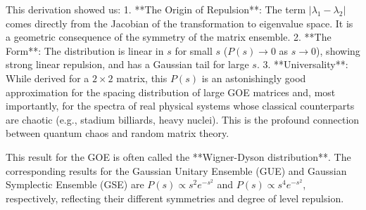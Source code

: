 \documentclass[10pt]{article}
\begin{document}
%
%
%


This derivation showed us:
1.  **The Origin of Repulsion**: The term $|\lambda_1 - \lambda_2|$ comes directly from the Jacobian of the transformation to eigenvalue space. It is a geometric consequence of the symmetry of the matrix ensemble.
2.  **The Form**: The distribution is linear in $s$ for small $s$ ($P(s) \to 0$ as $s \to 0$), showing strong linear repulsion, and has a Gaussian tail for large $s$.
3.  **Universality**: While derived for a $2\times2$ matrix, this $P(s)$ is an astonishingly good approximation for the spacing distribution of large GOE matrices and, most importantly, for the spectra of real physical systems whose classical counterparts are chaotic (e.g., stadium billiards, heavy nuclei). This is the profound connection between quantum chaos and random matrix theory.

This result for the GOE is often called the **Wigner-Dyson distribution**. The corresponding results for the Gaussian Unitary Ensemble (GUE) and Gaussian Symplectic Ensemble (GSE) are $P(s) \propto s^2 e^{-s^2}$ and $P(s) \propto s^4 e^{-s^2}$, respectively, reflecting their different symmetries and degree of level repulsion.
\end{document}
